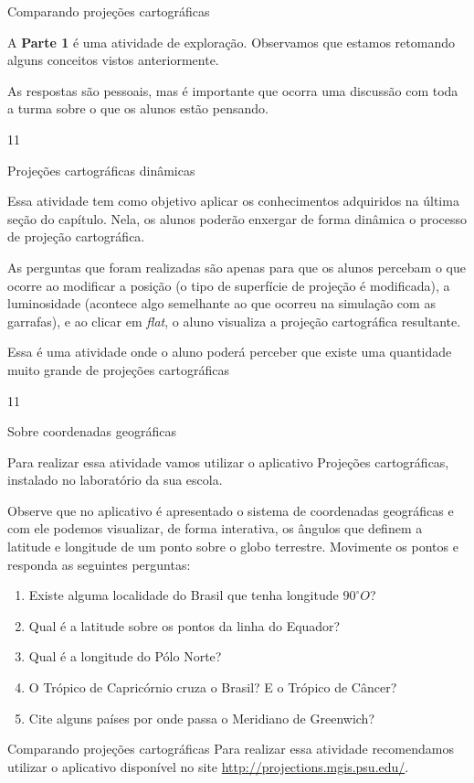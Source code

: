 {\begin{sugestions}{Comparando projeções cartográficas}
{  A \textbf{Parte 1} é uma atividade de exploração. Observamos que estamos retomando alguns conceitos vistos anteriormente.

  As respostas são pessoais, mas é importante que ocorra uma discussão com toda a turma sobre o que os alunos estão pensando.
}{1}{1}
\end{sugestions}
\begin{objectives}{Projeções cartográficas dinâmicas}
{
  Essa atividade tem como objetivo aplicar os conhecimentos adquiridos na última seção do capítulo.  Nela, os alunos poderão enxergar de forma dinâmica o processo de projeção cartográfica.

  As perguntas que foram realizadas são apenas para que os alunos percebam o que ocorre ao modificar a posição (o tipo de superfície de projeção é modificada), a luminosidade (acontece algo semelhante ao que ocorreu na simulação com as garrafas), e ao clicar em \textit{flat}, o aluno visualiza a projeção cartográfica resultante.

  Essa é uma atividade onde o aluno poderá perceber que existe uma quantidade muito grande de projeções cartográficas
}{1}{1}
\end{objectives}

\begin{task}{Sobre coordenadas geográficas} 

Para realizar essa atividade vamos utilizar o aplicativo Projeções cartográficas, instalado no laboratório da sua escola.

Observe que no aplicativo é apresentado o sistema de coordenadas geográficas e com ele podemos  visualizar, de forma interativa, os ângulos que definem a latitude e longitude de um ponto sobre o globo terrestre. Movimente os pontos e responda as seguintes perguntas:
\begin{enumerate}
\item Existe alguma localidade do Brasil que tenha longitude $90^{\circ} O$? 
\item Qual é a latitude sobre os pontos da linha do Equador? 
\item Qual é a longitude do Pólo Norte? 
\item O Trópico de Capricórnio cruza o Brasil? E o Trópico de Câncer? 
\item Cite alguns países por onde passa o Meridiano de Greenwich?
\end{enumerate}
\end{task}

\begin{task}{Comparando projeções cartográficas} 
Para realizar essa atividade recomendamos utilizar o aplicativo disponível no site \url{http://projections.mgis.psu.edu/}.


\end{task}}
